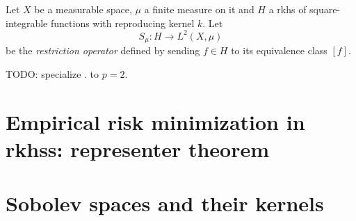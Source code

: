 Let $X$ be a measurable space, $\mu$ a finite measure on it
and $H$ a rkhs of square-integrable functions with reproducing 
kernel $k$.
Let 
\begin{equation*}
    S_\mu \colon H \to L^2(X,\mu)
\end{equation*}
be the \emph{restriction operator} defined by sending $f \in H$ 
to its equivalence class $[f]$.

TODO: specialize 
\cite[Propositions 4.4, 4.5 and Corollary 4.6]{devito_vvrkhs}.
to $p = 2$.

\section{Empirical risk minimization in rkhss: representer theorem}
\label{section:representer}

%

\section{Sobolev spaces and their kernels}
